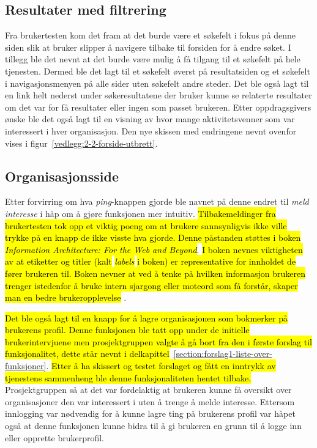 \subsection{Resultater med filtrering}

Fra brukertesten kom det fram at det burde være et søkefelt i fokus på denne siden slik at bruker slipper å navigere tilbake til forsiden for å endre søket. I tillegg ble det nevnt at det burde være mulig å få tilgang til et søkefelt på hele tjenesten. Dermed ble det lagt til et søkefelt øverst på resultatsiden og et søkefelt i navigasjonsmenyen på alle sider uten søkefelt andre steder. Det ble også lagt til en link helt nederst under søkeresultatene der bruker kunne se relaterte resultater om det var for få resultater eller ingen som passet brukeren. Etter oppdragsgivers ønske ble det også lagt til en visning av hvor mange aktivitetsvenner som var interessert i hver organisasjon. Den nye skissen med endringene nevnt ovenfor vises i figur~\ref{vedlegg:2-2-forside-utbrett}.

\subsection{Organisasjonsside}

Etter forvirring om hva {\em ping}-knappen gjorde ble navnet på denne endret til {\em meld interesse} i håp om å gjøre funksjonen mer intuitiv. \hl{Tilbakemeldinger fra brukertesten tok opp et viktig poeng om at brukere sannsynligvis ikke ville trykke på en knapp de ikke visste hva gjorde. Denne påstanden støttes i boken} {\em \hl{Information Architecture: For the Web and Beyond}}. \hl{I boken nevnes viktigheten av at etiketter og titler (kalt} {\em \hl{labels}} \hl{i boken) er representative for innholdet de fører brukeren til. Boken nevner at ved å tenke på hvilken informasjon brukeren trenger istedenfor å bruke intern sjargong eller moteord som få forstår, skaper man en bedre brukeropplevelse} \cite{INFARC:1}.

\hl{Det ble også lagt til en knapp for å lagre organisasjonen som bokmerker på brukerens profil. Denne funksjonen ble tatt opp under de initielle brukerintervjuene men prosjektgruppen valgte å gå bort fra den i første forslag til funksjonalitet, dette står nevnt i delkapittel}~\ref{section:forslag1-liste-over-funksjoner}. \hl{Etter å ha skissert og testet forslaget og fått en inntrykk av tjenestens sammenheng ble denne funksjonaliteten hentet tilbake.} Prosjektgruppen så at det var fordelaktig at brukeren kunne få oversikt over organisasjoner den var interessert i uten å trenge å melde interesse. Ettersom innlogging var nødvendig for å kunne lagre ting på brukerens profil var håpet også at denne funksjonen kunne bidra til å gi brukeren en grunn til å logge inn eller opprette brukerprofil.

